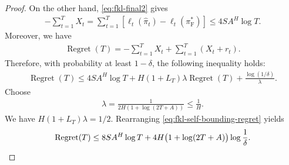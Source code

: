 \documentclass[11pt]{article}
\newcommand{\pif}{\pi_{\mathrm{F}}}
\begin{document}
\begin{proof}
On the other hand, \eqref{eq:fkl-final2} gives
\begin{align*}
    -\sum_{t=1}^T X_t
    =
    \sum_{t=1}^T
    \left[
        \ell_t(\hat\pi_t)-\ell_t(\pif^*)
    \right]
    \leq 4S A^H\log T.
\end{align*}
Moreover, we have
\begin{align*}
    \operatorname{Regret}(T)
    =
    -\sum_{t=1}^T X_t
    +
    \sum_{t=1}^T(X_t+r_t).
\end{align*}
Therefore, with probability at least $1-\delta$, the following inequality holds:
\begin{align}
    \operatorname{Regret}(T)
    \leq
    4S A^H\log T
    +
    H(1+L_T)\lambda\operatorname{Regret}(T)
    +
    \frac{\log(1/\delta)}{\lambda}.
\label{eq:fkl-self-bounding-regret}
\end{align}
Choose
\begin{align*}
    \lambda
    =
    \frac{1}{2H(1+\log(2T+A))} \le \frac{1}{H}.
\end{align*}
We have $H(1+L_T)\lambda = 1/2$. Rearranging
\eqref{eq:fkl-self-bounding-regret} yields
\begin{align}
    \operatorname{Regret}(T)
    \leq
    8S A^H\log T
    +
    4H\bigl(1+\log(2T+A)\bigr)
    \log\frac1\delta.
\notag
\end{align}
\end{proof}
\end{document}
